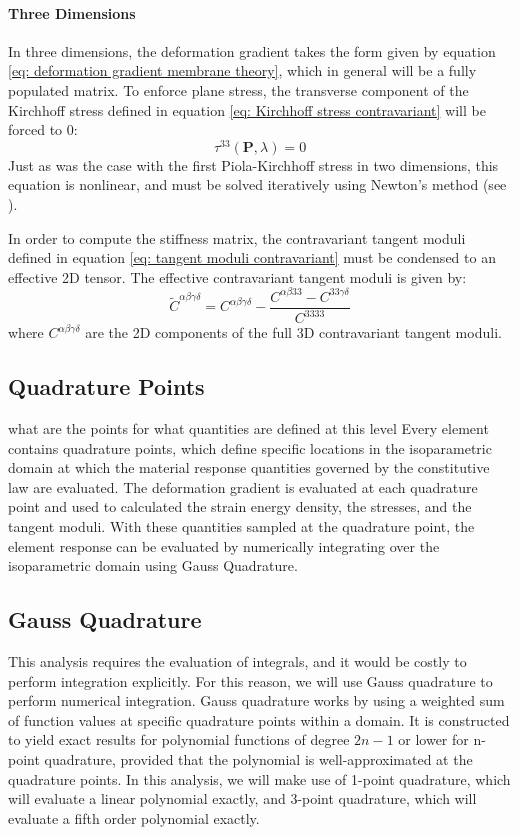 \documentclass[]{spie}  %
\begin{document}
\paragraph{Three Dimensions}
In three dimensions, the deformation gradient takes the form given by equation \ref{eq: deformation gradient membrane theory}, which in general will be a fully populated matrix. To enforce plane stress, the transverse component of the Kirchhoff stress defined in equation \ref{eq: Kirchhoff stress contravariant} will be forced to 0:
\begin{equation}
\tau^{33}(\bm{P}, \lambda) = 0
\end{equation}
Just as was the case with the first Piola-Kirchhoff stress in two dimensions, this equation is nonlinear, and must be solved iteratively using Newton's method (see \textit{}).

In order to compute the stiffness matrix, the contravariant tangent moduli defined in equation \ref{eq: tangent moduli contravariant} must be condensed to an effective 2D tensor. The effective contravariant tangent moduli is given by:
\begin{equation}
\label{eq: tangent moduli 2d effective}
\tilde{C}^{\alpha\beta\gamma\delta} = C^{\alpha\beta\gamma\delta} - \frac{C^{\alpha\beta 3 3} - C^{3 3 \gamma\delta}}{C^{3333}}
\end{equation}
where $C^{\alpha\beta\gamma\delta}$ are the 2D components of the full 3D contravariant tangent moduli.


\subsection{Quadrature Points}
what are the points for 
what quantities are defined at this level
Every element contains quadrature points, which define specific locations in the isoparametric domain at which the material response quantities governed by the constitutive law are evaluated. The deformation gradient is evaluated at each quadrature point and used to calculated the strain energy density, the stresses, and the tangent moduli. With these quantities sampled at the quadrature point, the element response can be evaluated by numerically integrating over the isoparametric domain using Gauss Quadrature.

\subsection{Gauss Quadrature}
This analysis requires the evaluation of integrals, and it would be costly to perform integration explicitly. For this reason, we will use Gauss quadrature to perform numerical integration. Gauss quadrature works by using a weighted sum of function values at specific quadrature points within a domain. It is constructed to yield exact results for polynomial functions of degree $2n-1$ or lower for n-point quadrature, provided that the polynomial is well-approximated at the quadrature points. In this analysis, we will make use of 1-point quadrature, which will evaluate a linear polynomial exactly, and 3-point quadrature, which will evaluate a fifth order polynomial exactly. 
\end{document}
